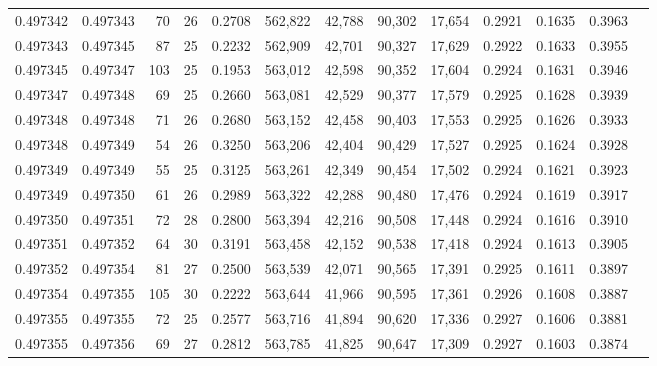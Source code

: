 \begin{tabular}{rrrrrrrrrrrrr}
0.497342 & 0.497343 &  70 &  26 &                                     0.2708 & 562,822 &  42,788 &  90,302 &  17,654 & 0.2921 & 0.1635 & 0.3963 \\
0.497343 & 0.497345 &  87 &  25 &                                     0.2232 & 562,909 &  42,701 &  90,327 &  17,629 & 0.2922 & 0.1633 & 0.3955 \\
0.497345 & 0.497347 & 103 &  25 &                                     0.1953 & 563,012 &  42,598 &  90,352 &  17,604 & 0.2924 & 0.1631 & 0.3946 \\
0.497347 & 0.497348 &  69 &  25 &                                     0.2660 & 563,081 &  42,529 &  90,377 &  17,579 & 0.2925 & 0.1628 & 0.3939 \\
0.497348 & 0.497348 &  71 &  26 &                                     0.2680 & 563,152 &  42,458 &  90,403 &  17,553 & 0.2925 & 0.1626 & 0.3933 \\
0.497348 & 0.497349 &  54 &  26 &                                     0.3250 & 563,206 &  42,404 &  90,429 &  17,527 & 0.2925 & 0.1624 & 0.3928 \\
0.497349 & 0.497349 &  55 &  25 &                                     0.3125 & 563,261 &  42,349 &  90,454 &  17,502 & 0.2924 & 0.1621 & 0.3923 \\
0.497349 & 0.497350 &  61 &  26 &                                     0.2989 & 563,322 &  42,288 &  90,480 &  17,476 & 0.2924 & 0.1619 & 0.3917 \\
0.497350 & 0.497351 &  72 &  28 &                                     0.2800 & 563,394 &  42,216 &  90,508 &  17,448 & 0.2924 & 0.1616 & 0.3910 \\
0.497351 & 0.497352 &  64 &  30 &                                     0.3191 & 563,458 &  42,152 &  90,538 &  17,418 & 0.2924 & 0.1613 & 0.3905 \\
0.497352 & 0.497354 &  81 &  27 &                                     0.2500 & 563,539 &  42,071 &  90,565 &  17,391 & 0.2925 & 0.1611 & 0.3897 \\
0.497354 & 0.497355 & 105 &  30 &                                     0.2222 & 563,644 &  41,966 &  90,595 &  17,361 & 0.2926 & 0.1608 & 0.3887 \\
0.497355 & 0.497355 &  72 &  25 &                                     0.2577 & 563,716 &  41,894 &  90,620 &  17,336 & 0.2927 & 0.1606 & 0.3881 \\
0.497355 & 0.497356 &  69 &  27 &                                     0.2812 & 563,785 &  41,825 &  90,647 &  17,309 & 0.2927 & 0.1603 & 0.3874 \\

\end{tabular}
